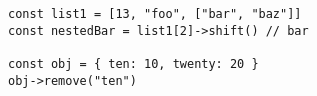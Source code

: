 \vspace{-2.5em}
\begin{center}
\begin{minipage}[t]{1\textwidth}
\begin{listing}[H]
\begin{spacing}{0.6}
\begin{verbatim}
const list1 = [13, "foo", ["bar", "baz"]]
const nestedBar = list1[2]->shift() // bar

const obj = { ten: 10, twenty: 20 }
obj->remove("ten")
\end{verbatim}
\end{spacing}
\end{listing}
\end{minipage}
\end{center}
